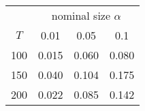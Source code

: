 % 
\begin{tabular}{cccc}
  \hline
  & \multicolumn{3}{c}{nominal size $\alpha$} \\
 $T$ & 0.01 & 0.05 & 0.1 \\
 \hline
100 & 0.015 & 0.060 & 0.080 \\ 
  150 & 0.040 & 0.104 & 0.175 \\ 
  200 & 0.022 & 0.085 & 0.142 \\ 
   \hline
\end{tabular}
